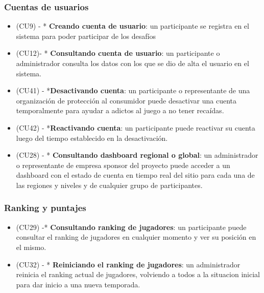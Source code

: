 \subsubsection{Cuentas de usuarios}
\begin{itemize}
\item (CU9) - * \textbf{Creando cuenta de usuario}: un participante se registra en el sistema para poder participar de los desafíos
\item (CU12)- * \textbf{Consultando cuenta de usuario}: un participante o administrador consulta los datos con los que se dio de alta el usuario en el sistema.
\item (CU41) - *\textbf{Desactivando cuenta}: un participante o representante de una organización de protección al consumidor puede desactivar una cuenta temporalmente para ayudar a adictos al juego a no tener recaídas.
\item (CU42) - *\textbf{Reactivando cuenta}: un participante puede reactivar su cuenta luego del tiempo establecido en la desactivación.
\item (CU28) - * \textbf{Consultando dashboard regional o global}: un administrador o representante de empresa sponsor del proyecto puede acceder a un dashboard con el estado de cuenta en tiempo real del sitio para cada una de las regiones y niveles y de cualquier grupo de participantes.
\end{itemize}

\subsubsection{Ranking y puntajes}

\begin{itemize}
\item (CU29) -* \textbf{Consultando ranking de jugadores}: un participante puede consultar el ranking de jugadores en cualquier momento y ver su posición en el mismo.
\item (CU32) - * \textbf{Reiniciando el ranking de jugadores}: un administrador reinicia el ranking actual de jugadores, volviendo a todos a la situacion inicial para dar inicio a una nueva temporada.
\end{itemize}


